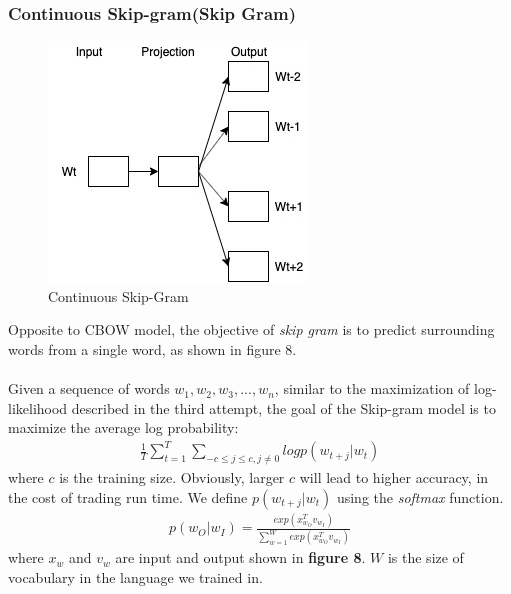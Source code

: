 \documentclass[paper=a4, fontsize=12pt]{scrartcl}
\begin{document}
\subsubsection{Continuous Skip-gram(Skip Gram)}
 \begin{figure}
  \includegraphics[scale=1]{skip-gram.jpg}
  \caption{Continuous Skip-Gram}
  \label{fig:skip-gram}
\end{figure}
Opposite to CBOW model, the objective of \textit{skip gram} is to predict surrounding words from a single word, as shown in figure 8.\\\\
Given a sequence of words $w_1, w_2, w_3, ..., w_n$, similar to the maximization of log-likelihood described in the third attempt, the goal of the Skip-gram model is to maximize the average log probability:
\begin{align*}
\frac{1}{T}\sum_{t=1}^{T} \sum_{-c \leq j \leq c, j \neq 0} log p (w_{t+j} | w_t)
\end{align*}
where $c$ is the training size. Obviously, larger $c$ will lead to higher accuracy, in the cost of trading run time. We define $p (w_{t+j} | w_t)$ using the \textit{softmax} function. 
\begin{align*}
p(w_O | w_I) = \frac{exp(x^T_{w_O}  v_{w_I})}{\sum^W_{w=1}exp(x^T_{w_O} v_{w_I})}
\end{align*}
where $x_w$ and $v_w$ are input and output shown in \textbf{figure 8}. $W$ is the size of vocabulary in the language we trained in. 
\end{document}

